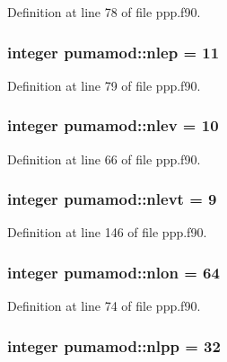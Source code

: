\-Definition at line 78 of file ppp.\-f90.

\hypertarget{classpumamod_a05c1015570a9ac8a74602db90dfe9113}{
\subsubsection[{nlep}]{\setlength{\rightskip}{0pt plus 5cm}integer {\bf pumamod\-::nlep} = 11}}
\label{classpumamod_a05c1015570a9ac8a74602db90dfe9113}


\-Definition at line 79 of file ppp.\-f90.

\hypertarget{classpumamod_a3de2d3dcdd767a858dfb9f64f129087f}{
\subsubsection[{nlev}]{\setlength{\rightskip}{0pt plus 5cm}integer {\bf pumamod\-::nlev} = 10}}
\label{classpumamod_a3de2d3dcdd767a858dfb9f64f129087f}


\-Definition at line 66 of file ppp.\-f90.

\hypertarget{classpumamod_a6d50c7a2bbb6196702e7f4f4a0dc5be8}{
\subsubsection[{nlevt}]{\setlength{\rightskip}{0pt plus 5cm}integer {\bf pumamod\-::nlevt} = 9}}
\label{classpumamod_a6d50c7a2bbb6196702e7f4f4a0dc5be8}


\-Definition at line 146 of file ppp.\-f90.

\hypertarget{classpumamod_ac6cf2d31f555e462d15dfb23afd6a035}{
\subsubsection[{nlon}]{\setlength{\rightskip}{0pt plus 5cm}integer {\bf pumamod\-::nlon} = 64}}
\label{classpumamod_ac6cf2d31f555e462d15dfb23afd6a035}


\-Definition at line 74 of file ppp.\-f90.

\hypertarget{classpumamod_aee2e0766afdaa439ad0c79c10289b723}{
\subsubsection[{nlpp}]{\setlength{\rightskip}{0pt plus 5cm}integer {\bf pumamod\-::nlpp} = 32}}
\label{classpumamod_aee2e0766afdaa439ad0c79c10289b723}


